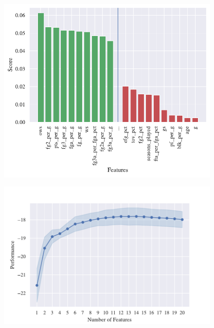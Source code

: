 \begin{figure}[H]
\centering
\hspace*{\fill}%
\begin{minipage}{.45\textwidth}
  \centering
  \vspace{0pt}
  \includegraphics[width=1.0\linewidth]{figures/relieff.pdf}
  \label{fig:relief}
\end{minipage}%
\hfill
\begin{minipage}{.45\textwidth}
  \centering
  \vspace{-5em}
  \includegraphics[width=1.0\linewidth]{figures/sfs.pdf}
  \label{fig:sfs}
\end{minipage}
\hspace*{\fill}%
\end{figure}

